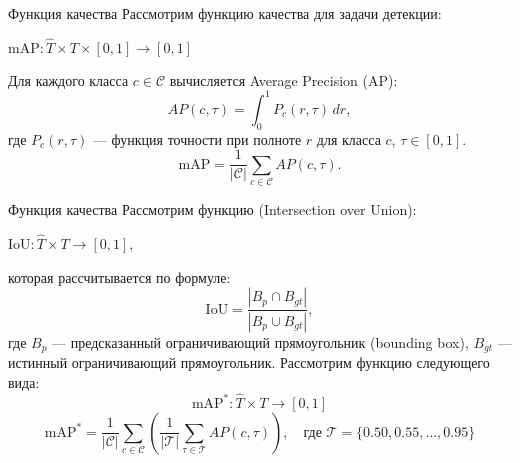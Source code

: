 \documentclass{beamer}
\begin{document}
\begin{frame}{Функция качества}
Рассмотрим функцию качества для задачи детекции:
\begin{center}
   $\text{mAP}: \hat{T} \times {T} \times [0,1] \to [0,1]$ 
\end{center}
Для каждого класса \(c \in \mathcal{C}\) вычисляется Average Precision (AP):
\[
AP(c, \tau) = \int_{0}^{1} P_c(r, \tau) \, dr,
\]
где \(P_c(r, \tau)\) --- функция точности при полноте \(r\) для класса \(c\), $\tau \in [0,1]$.
\[
\text{mAP} = \frac{1}{|\mathcal{C}|} \sum_{c \in \mathcal{C}} AP(c, \tau).
\]
\end{frame}
\begin{frame}{Функция качества}
Рассмотрим функцию  (Intersection over Union):
\begin{center}
   $\text{IoU}: \hat{T} \times {T} \to [0,1]$,
\end{center}
которая рассчитывается по формуле:
\[
\text{IoU} = \frac{|B_p \cap B_{gt}|}{|B_p \cup B_{gt}|},
\]
где \(B_p\) --- предсказанный ограничивающий прямоугольник (bounding box), \(B_{gt}\) --- истинный ограничивающий прямоугольник. Рассмотрим функцию следующего вида:
\[
\text{mAP}^{*}: \hat{T} \times {T} \to [0,1]
\]
\[
\text{mAP}^{*} = \frac{1}{|\mathcal{C}|} \sum_{c \in \mathcal{C}} \left( \frac{1}{|\mathcal{T}|} \sum_{\tau \in \mathcal{T}} AP(c, \tau) \right),
\quad \text{где } \mathcal{T} = \{0.50, 0.55, \dots, 0.95\}
\]

\end{frame}
\end{document}
